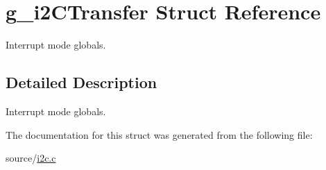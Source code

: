 \hypertarget{structg__i2CTransfer}{}\section{g\+\_\+i2\+C\+Transfer Struct Reference}
\label{structg__i2CTransfer}


Interrupt mode globals.  




\subsection{Detailed Description}
Interrupt mode globals. 

The documentation for this struct was generated from the following file\+:\begin{DoxyCompactItemize}
\item 
source/\mbox{\hyperlink{i2c_8c}{i2c.\+c}}\end{DoxyCompactItemize}
